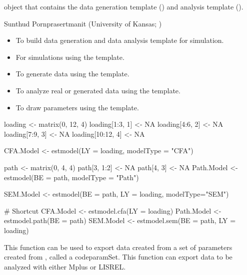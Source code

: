 \documentclass[a4paper]{book}
\begin{document}
%
\begin{Value}
 object that contains the data generation template () and analysis template ().
\end{Value}
%
\begin{Author}\relax
Sunthud Pornprasertmanit (University of Kansas; )
\end{Author}
%
\begin{SeeAlso}\relax
\begin{itemize}

\item {} To build data generation and data analysis template for simulation.
\item {} For simulations using the  template.
\item {} To generate data using the  template.
\item {} To analyze real or generated data using the  template.
\item {} To draw parameters using the  template.

\end{itemize}

\end{SeeAlso}
%
\begin{Examples}
\begin{ExampleCode}
loading <- matrix(0, 12, 4)
loading[1:3, 1] <- NA
loading[4:6, 2] <- NA
loading[7:9, 3] <- NA
loading[10:12, 4] <- NA

CFA.Model <- estmodel(LY = loading, modelType = "CFA")

path <- matrix(0, 4, 4)
path[3, 1:2] <- NA
path[4, 3] <- NA
Path.Model <- estmodel(BE = path, modelType = "Path")

SEM.Model <- estmodel(BE = path, LY = loading, modelType="SEM")

# Shortcut
CFA.Model <- estmodel.cfa(LY = loading)
Path.Model <- estmodel.path(BE = path)
SEM.Model <- estmodel.sem(BE = path, LY = loading)
\end{ExampleCode}
\end{Examples}
%
\begin{Description}\relax
This function can be used to export data created from a set of parameters created from , called a codeparamSet. This function can export data to be analyzed with either Mplus or LISREL.
\end{Description}
\end{document}
